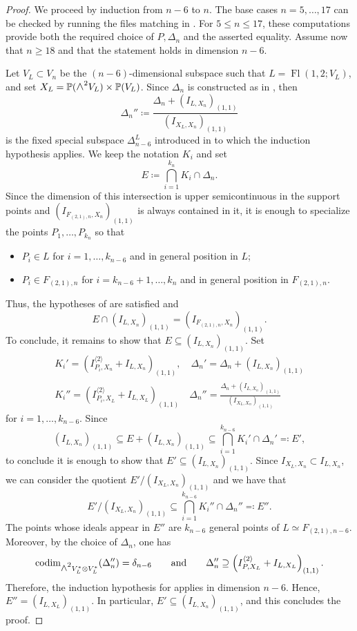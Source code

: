 \documentclass[a4paper,reqno]{amsart}
\theoremstyle{plainnopunct}
\theoremstyle{definitionnopunct}
\newcommand{\superwedge}{\mathlarger{\mathlarger{\wedge}}}
\renewcommand{\P}{\mathbb{P}}
\newcommand{\codim}{\operatorname{codim}}
\DeclareMathOperator{\Fl}{Fl}
\begin{document}
\begin{proof}
We proceed by induction from $n-6$ to $n$.
The base cases $n=5,\dots,17$ can be checked by running
the files matching  in
\cite{Repo}.
For $5\leq n\leq17$, these computations provide both the
required choice of $P,\Delta_n$ and the asserted equality. Assume now
that $n\geq18$ and that the statement holds in dimension $n-6$.

Let $V_L\subset V_n$ be the 
$(n-6)$-dimensional subspace such that $L=\Fl(1,2;V_L)$, and set $X_L=\P(\superwedge^2V_L)\times\P(V_L)$. Since $\Delta_n$ is constructed as in , then
\[
\Delta_n''
\coloneq
\frac{
\Delta_n+(I_{L,X_n})_{(1,1)}
}{
(I_{X_L,X_n})_{(1,1)}
}
\]
is the fixed special subspace $\Delta_{n-6}^{L}$ introduced in  to which the
induction hypothesis applies. We keep the notation $K_i$ and set
\[
E
\coloneq
\bigcap_{i=1}^{k_n}K_i
\cap
\Delta_n.
\]
Since the dimension of this intersection is upper semicontinuous in the support points and $\left(I_{F_{(2,1),n},X_n}\right)_{(1,1)}$ is always contained in it, it is enough to specialize the points $P_1,\ldots,P_{k_n}$ so that
\begin{itemize}[leftmargin=*]
\item $P_i\in L$ for $i=1,\dots,k_{n-6}$ and in general position in
$L$;
\item $P_i\in F_{(2,1),n}$ for
$i=k_{n-6}+1,\dots,k_n$ and in general position in
$F_{(2,1),n}$.
\end{itemize}
Thus, the hypotheses of  are satisfied and
\[
E\cap
\left(
I_{L,X_n}
\right)_{(1,1)}
=
\left(
I_{F_{(2,1),n},X_n}
\right)_{(1,1)}.
\]
To conclude, it remains to show that $E \subseteq \left( I_{L,X_n}
\right)_{(1,1)}$. Set
\begin{gather*}
K_{i}'=(I^{\langle2\rangle}_{P_i,X_n}+I_{L,X_n})_{(1,1)},\quad
\Delta_n'=\Delta_n+(I_{L,X_n})_{(1,1)}
\\
K_{i}''=(I^{\langle2\rangle}_{P_i, X_{L}}+I_{L,X_L})_{(1,1)}
\quad
\Delta_n''=\frac{\Delta_n+(I_{L,X_n})_{(1,1)}}{(I_{X_L,X_n})_{(1,1)}}
\end{gather*}
for $i=1,\dots,k_{n-6}$. Since
$$(I_{L,X_n})_{(1,1)}\subseteq E+(I_{L,X_n})_{(1,1)}\subseteq\bigcap_{i=1}^{k_{n-6}}K_i'\cap \Delta_n'\eqcolon E',$$
to conclude it is enough to show that $E'\subseteq(I_{L,X_n})_{(1,1)}$. Since $I_{X_L,X_n}\subset I_{L,X_n}$, we can consider the quotient $E'/(I_{X_L,X_n})_{(1,1)}$ and we have that 
$$E'/(I_{X_L,X_n})_{(1,1)}\subseteq \bigcap_{i=1}^{k_{n-6}}K_{i}''\cap\Delta_n''\eqcolon E''.$$
The points whose ideals appear in $E''$ are $k_{n-6}$ general
points of $L \simeq F_{(2,1),n-6}$. Moreover, by the choice of $\Delta_n$, one has
\[
\codim_{\superwedge^2V_L^*\otimes V_L^*}
(\Delta_n'')
=
\delta_{n-6}
\qquad \text{and}
\qquad
\Delta_n''
\supseteq
\left(
I_{P,X_L}^{\langle2\rangle}
+
I_{L,X_L}
\right)_{(1,1)}.
\]
Therefore, the induction hypothesis for  applies
in dimension $n-6$. Hence, $E''
=
\left(
I_{L,X_L}
\right)_{(1,1)}$.
In particular,
$
E'
\subseteq
\left(
I_{L,X_n}
\right)_{(1,1)}$,
and this concludes the proof.
\end{proof}
\end{document}
